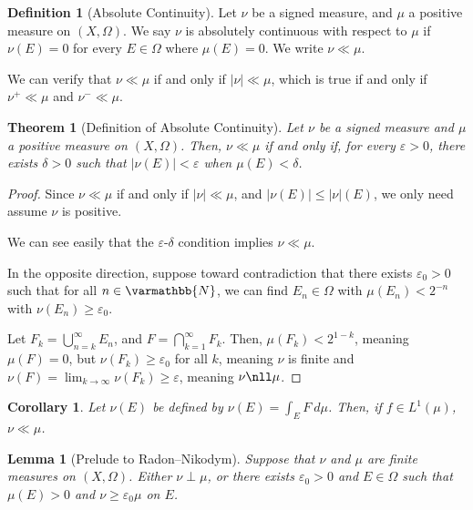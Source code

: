 \documentclass[12pt]{extarticle}
\newcommand{\N}{\mathbb{N}}
\newcommand{\ve}{\varepsilon}
\theoremstyle{plain}
\newtheorem*{theorem}{Theorem}
\newtheorem*{lemma}{Lemma}
\newtheorem*{corollary}{Corollary}
\theoremstyle{definition}
\newtheorem*{definition}{Definition}
\theoremstyle{note}
\renewcommand*{\mathbb}[1]{\varmathbb{#1}}
\renewcommand{\newline}{\hfill\break}
\begin{document}
\begin{definition}[Absolute Continuity]
Let $\nu$ be a signed measure, and $\mu$ a positive measure on $(X,\Omega)$. We say $\nu$ is absolutely continuous with respect to $\mu$ if $\nu(E) = 0$ for every $E\in \Omega$ where $\mu(E) = 0$. We write $\nu \ll \mu$.\newline

We can verify that $\nu \ll \mu$ if and only if $|\nu| \ll \mu$, which is true if and only if $\nu^{+}\ll \mu$ and $\nu^{-}\ll \mu$.
\end{definition}
\begin{theorem}[Definition of Absolute Continuity]
  Let $\nu$ be a signed measure and $\mu$ a positive measure on $(X,\Omega)$. Then, $\nu \ll \mu$ if and only if, for every $\ve > 0$, there exists $\delta > 0$ such that $\left\vert \nu(E) \right\vert < \ve$ when $\mu\left(E\right)< \delta$.
\end{theorem}
\begin{proof}
  Since $\nu \ll \mu$ if and only if $\left\vert \nu \right\vert\ll\mu$, and $\left\vert \nu(E) \right\vert\leq \left\vert \nu \right\vert\left(E\right)$, we only need assume $\nu$ is positive.\newline

  We can see easily that the $\ve$-$\delta$ condition implies $\nu \ll \mu$.\newline

  In the opposite direction, suppose toward contradiction that there exists $\ve_0 > 0$ such that for all $n\in \N$, we can find $E_n\in \Omega$ with $\mu\left(E_n\right) < 2^{-n}$ with $\nu\left(E_n\right) \geq \ve_0$.\newline

  Let $F_k = \bigcup_{n=k}^{\infty}E_n$, and $F = \bigcap_{k=1}^{\infty}F_k$. Then, $\mu\left(F_k\right) < 2^{1-k}$, meaning $\mu(F) = 0$, but $\nu\left(F_k\right) \geq \ve_0$ for all $k$, meaning $\nu$ is finite and $\nu\left(F\right) = \lim_{k\rightarrow\infty}\nu\left(F_k\right) \geq \ve$, meaning $\nu \nll \mu$.
\end{proof}
\begin{corollary}
  Let $\nu(E)$ be defined by $\nu(E) = \int_{E}^{} F\:d\mu$. Then, if $f\in L^{1}\left(\mu\right)$, $\nu \ll \mu$.
\end{corollary}
\begin{lemma}[Prelude to Radon--Nikodym]
  Suppose that $\nu$ and $\mu$ are finite measures on $(X,\Omega)$. Either $\nu \perp \mu$, or there exists $\ve_0 > 0$ and $E\in \Omega$ such that $\mu(E) > 0$ and $\nu \geq \ve_0 \mu$ on $E$.
\end{lemma}
\end{document}
